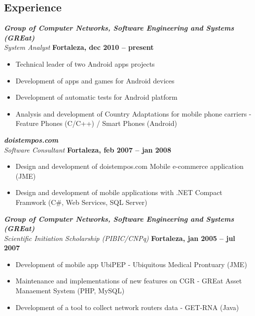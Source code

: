 \documentclass[margin, 10pt]{res} %
\begin{document}
\begin{resume}
\section{Experience}
{\sl\bf Group of Computer Networks, Software Engineering and Systems (GREat)}  \\
{\sl System Analyst} \hfill {\bf Fortaleza, dec 2010 -- present}
\begin{itemize} \itemsep -2pt %
\item Technical leader of two Android apps projects
\item Development of apps and games for Android devices
\item Development of automatic tests for Android platform
\item Analysis and development of Country Adaptations for mobile phone carriers - Feature Phones (C/C++) / Smart Phones (Android)
\end{itemize}
 
{\sl\bf doistempos.com} \\
{\sl Software Consultant} \hfill {\bf Fortaleza, feb 2007 -- jan 2008}
\begin{itemize} \itemsep -2pt 
\item Design and development of doistempos.com Mobile e-commerce application (JME)
\item Design and development of mobile applications with .NET Compact Framwork (C\#, Web Services, SQL Server)
\end{itemize} 


{\sl\bf Group of Computer Networks, Software Engineering and Systems (GREat)}  \\
{\sl Scientific Initiation Scholarship (PIBIC/CNPq)} \hfill {\bf Fortaleza, jan 2005 -- jul 2007}
\begin{itemize} \itemsep -2pt %
\item Development of mobile app UbiPEP - Ubiquitous Medical Prontuary (JME)
\item Maintenance and implementations of new features on CGR - GREat Asset Manaement System (PHP, MySQL)
\item Development of a tool to collect network routers data - GET-RNA (Java)
\end{itemize}



\end{resume}
\end{document}
